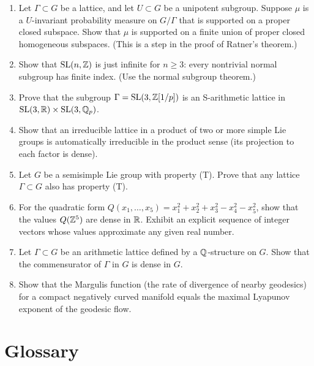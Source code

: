 \begin{enumerate}
    \item [A] Let \(\Gamma \subset G\) be a lattice, and let \(U \subset G\) be a unipotent subgroup. Suppose \(\mu\) is a \(U\)-invariant probability measure on \(G/\Gamma\) that is supported on a proper closed subspace. Show that \(\mu\) is supported on a finite union of proper closed homogeneous subspaces. (This is a step in the proof of Ratner's theorem.)
    \item [I] Show that \(\operatorname{SL}(n,\mathbb{Z})\) is just infinite for \(n \geq 3\): every nontrivial normal subgroup has finite index. (Use the normal subgroup theorem.)
    \item [I] Prove that the subgroup \(\Gamma = \operatorname{SL}(3,\mathbb{Z}[1/p])\) is an S-arithmetic lattice in \(\operatorname{SL}(3,\mathbb{R}) \times \operatorname{SL}(3,\mathbb{Q}_p)\).
    \item [I] Show that an irreducible lattice in a product of two or more simple Lie groups is automatically irreducible in the product sense (its projection to each factor is dense).
    \item [I] Let \(G\) be a semisimple Lie group with property (T). Prove that any lattice \(\Gamma \subset G\) also has property (T).
    \item [I] For the quadratic form \(Q(x_1,\dots,x_5) = x_1^2 + x_2^2 + x_3^2 - x_4^2 - x_5^2\), show that the values \(Q(\mathbb{Z}^5)\) are dense in \(\mathbb{R}\). Exhibit an explicit sequence of integer vectors whose values approximate any given real number.
    \item [I] Let \(\Gamma \subset G\) be an arithmetic lattice defined by a \(\mathbb{Q}\)-structure on \(G\). Show that the commensurator of \(\Gamma\) in \(G\) is dense in \(G\).
    \item [I] Show that the Margulis function (the rate of divergence of nearby geodesics) for a compact negatively curved manifold equals the maximal Lyapunov exponent of the geodesic flow.
\end{enumerate}

\section*{Glossary}

